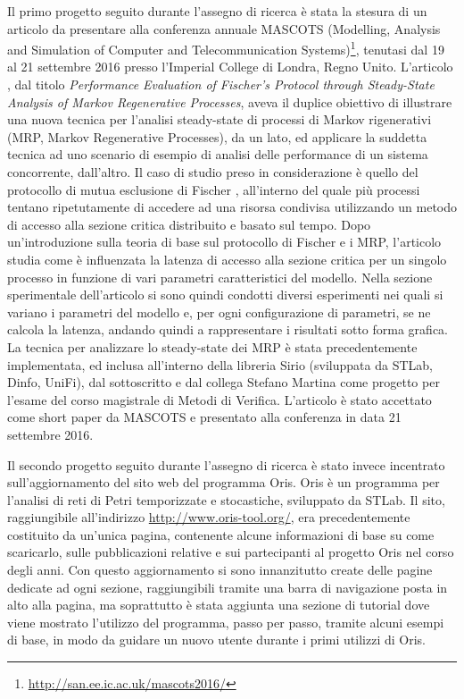 \documentclass{article}
\begin{document}
    Il primo progetto seguito durante l'assegno di ricerca è stata la stesura di un articolo da presentare alla conferenza annuale MASCOTS (Modelling, Analysis and Simulation of Computer and Telecommunication Systems)\footnote{\url{http://san.ee.ic.ac.uk/mascots2016/}}, tenutasi dal 19 al 21 settembre 2016 presso l'Imperial College di Londra, Regno Unito. L'articolo \cite{mascots16}, dal titolo \textit{Performance Evaluation of Fischer's Protocol through Steady-State Analysis of Markov Regenerative Processes}, aveva il duplice obiettivo di illustrare una nuova tecnica per l'analisi steady-state di processi di Markov rigenerativi (MRP, Markov Regenerative Processes), da un lato, ed applicare la suddetta tecnica ad uno scenario di esempio di analisi delle performance di un sistema concorrente, dall'altro. Il caso di studio preso in considerazione è quello del protocollo di mutua esclusione di Fischer \cite{fischer85}, all'interno del quale più processi tentano ripetutamente di accedere ad una risorsa condivisa utilizzando un metodo di accesso alla sezione critica distribuito e basato sul tempo. Dopo un'introduzione sulla teoria di base sul protocollo di Fischer e i MRP, l'articolo studia come è influenzata la latenza di accesso alla sezione critica per un singolo processo in funzione di vari parametri caratteristici del modello. Nella sezione sperimentale dell'articolo si sono quindi condotti diversi esperimenti nei quali si variano i parametri del modello e, per ogni configurazione di parametri, se ne calcola la latenza, andando quindi a rappresentare i risultati sotto forma grafica. La tecnica per analizzare lo steady-state dei MRP è stata precedentemente implementata, ed inclusa all'interno della libreria Sirio (sviluppata da STLab, Dinfo, UniFi), dal sottoscritto e dal collega Stefano Martina come progetto per l'esame del corso magistrale di Metodi di Verifica. L'articolo è stato accettato come short paper da MASCOTS e presentato alla conferenza in data 21 settembre 2016.
    
    Il secondo progetto seguito durante l'assegno di ricerca è stato invece incentrato sull'aggiornamento del sito web del programma Oris. Oris è un programma per l'analisi di reti di Petri temporizzate e stocastiche, sviluppato da STLab. Il sito, raggiungibile all'indirizzo \url{http://www.oris-tool.org/}, era precedentemente costituito da un'unica pagina, contenente alcune informazioni di base su come scaricarlo, sulle pubblicazioni relative e sui partecipanti al progetto Oris nel corso degli anni. Con questo aggiornamento si sono innanzitutto create delle pagine dedicate ad ogni sezione, raggiungibili tramite una barra di navigazione posta in alto alla pagina, ma soprattutto è stata aggiunta una sezione di tutorial dove viene mostrato l'utilizzo del programma, passo per passo, tramite alcuni esempi di base, in modo da guidare un nuovo utente durante i primi utilizzi di Oris.
    
    
    
    
    \clearpage
    
	
	
\end{document}
